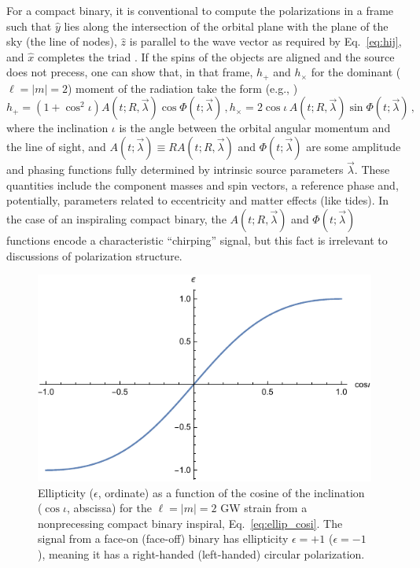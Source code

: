 \documentclass[aps,prd,twocolumn,superscriptaddress,preprintnumbers,floatfix,nofootinbib]{revtex4-2}
\newcommand{\beq}{\begin{equation}}
\newcommand{\eeq}{\end{equation}}
\newcommand*{\eq}[1]{Eq.~\eqref{eq:#1}}
\begin{document}
For a compact binary, it is conventional to compute the polarizations in a frame such that $\hat{y}$ lies along the intersection of the orbital plane with the plane of the sky (the line of nodes), $\hat{z}$ is parallel to the wave vector as required by \eq{hij}, and $\hat{x}$ completes the triad \cite{LALSuite:source}.
If the spins of the objects are aligned and the source does not precess, one can show that, in that frame, $h_+$ and $h_\times$ for the dominant ($\ell=|m|=2$) moment of the radiation take the form (e.g., \cite{Poisson2014})
\begin{subequations} \label{eq:cbc}
\beq
h_+ = \left(1 + \cos^2 \iota\right) A(t; R, \vec{\lambda}) \cos \Phi(t; \vec{\lambda}) \, , 
\label{eq:cbc_p} 
\eeq
\beq
h_\times = 2 \cos \iota\, A(t; R, \vec{\lambda}) \sin \Phi(t; \vec{\lambda})\, ,
\label{eq:cbc_c}
\eeq
\end{subequations}
where the inclination $\iota$ is the angle between the orbital angular momentum and the line of sight, and $A(t; \vec{\lambda}) \equiv R  A(t; R, \vec{\lambda})$ and $\Phi(t; \vec{\lambda})$ are some amplitude and phasing functions fully determined by intrinsic source parameters $\vec{\lambda}$.
These quantities include the component masses and spin vectors, a reference phase and, potentially, parameters related to eccentricity and matter effects (like tides).
In the case of an inspiraling compact binary, the $A(t; R, \vec{\lambda})$ and $\Phi(t; \vec{\lambda})$ functions encode a characteristic ``chirping'' signal, but this fact is irrelevant to discussions of polarization structure.

\begin{figure}
\includegraphics[width=\columnwidth]{ellip_cosi}
\caption{Ellipticity ($\epsilon$, ordinate) as a function of the cosine of the inclination ($\cos\iota$, abscissa) for the $\ell = |m| = 2$ GW strain from a nonprecessing compact binary inspiral, Eq.~\eqref{eq:ellip_cosi}. The signal from a face-on (face-off) binary has ellipticity $\epsilon = +1$ ($\epsilon=-1$), meaning it has a right-handed (left-handed) circular polarization.}
\label{fig:ellip_cosi}
\end{figure}
\end{document}
